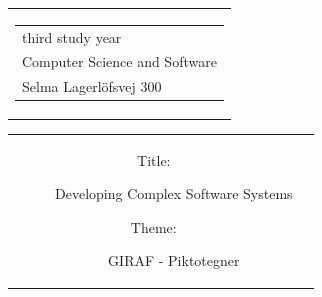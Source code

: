 

\thispagestyle{empty}
\begin{titlingpage}
 \begin{nopagebreak}
 {\samepage 
 \begin{tabular}{r}
\parbox{\textwidth}{  
 \hfill \parbox{4.9cm}{\begin{tabular}{l}
{\textsf\small \textsf{third study year}}\\
{\textsf\small \textsf{Computer Science and Software}} \\
{\textsf\small \textsf{Selma Lagerlöfsvej 300}} \\
 \end{tabular}}
}
\end{tabular}

 \begin{tabular}{cc}
\parbox{7cm}{
\begin{description}

\item[Title:]

Developing Complex Software Systems
  
 \item[Theme:]

GIRAF - Piktotegner

 \end{description}

\parbox{8cm}{

}}
\end{tabular}}
\end{nopagebreak}
\end{titlingpage}
